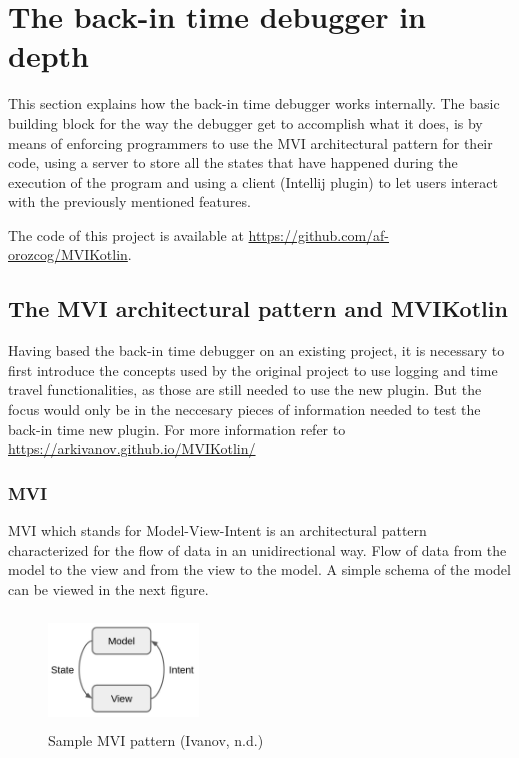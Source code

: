 
\chapter{The back-in time debugger in depth}
\label{cha:indepth}

This section explains how the back-in time debugger works internally. The basic building block for the way the debugger get to accomplish what it does, is by means of enforcing programmers to use the MVI architectural pattern for their code, using a server to store all the states that have happened during the execution of the program and using a client (Intellij plugin) to let users interact with the previously mentioned features.

The code of this project is available at \url{https://github.com/af-orozcog/MVIKotlin}.

\section{The MVI architectural pattern and MVIKotlin}

Having based the back-in time debugger on an existing project, it is necessary to first introduce the concepts used by the original project to use logging and time travel functionalities, as those are still needed to use the new plugin. But the focus would only be in the neccesary pieces of information needed to test the back-in time new plugin. For more information refer to \url{https://arkivanov.github.io/MVIKotlin/}

\subsection{MVI}

MVI which stands for Model-View-Intent is an architectural pattern characterized for the flow of data in an unidirectional way. Flow of data from the model to the view and from the view to the model. A simple schema of the model can be viewed in the next figure.

\begin{figure}[h]
\centering
\includegraphics[height=3cm,width=4cm]{figures/mvi}
\caption{Sample MVI pattern (Ivanov, n.d.)}
\label{fig: Sample MVI pattern}
\end{figure}

